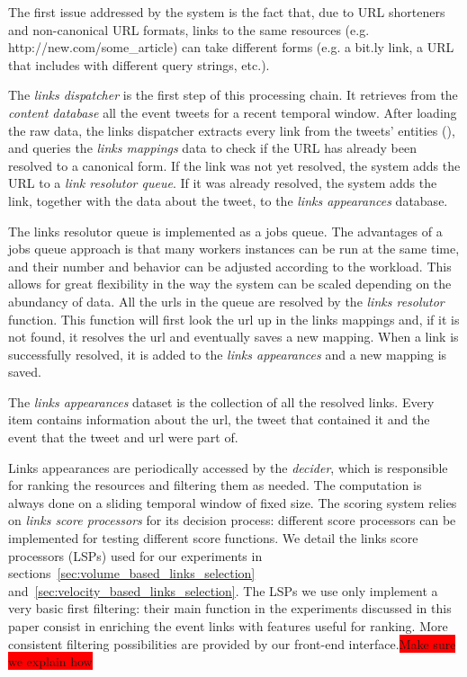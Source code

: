 \documentclass{sig-alternate}
\newcommand{\todo}[1]{\colorbox{red}{#1}}
\begin{document}
The first issue addressed by the system is the fact that, due to URL shorteners and non-canonical URL formats, links to the same resources (e.g. http://new.com/some\_article) can take different forms (e.g. a bit.ly link, a URL that includes with different query strings, etc.).  

The \emph{links dispatcher} is the first step of this processing chain. It retrieves from the \emph{content database} all the event tweets for a recent temporal window. After loading the raw data, the links dispatcher extracts every link from the tweets' entities (\cite{RestTweetsDoc}), and queries the \emph{links mappings} data to check if the URL has already been resolved to a canonical form. If the link was not yet resolved, the system adds the URL to a \emph{link resolutor queue}. If it was already resolved, the system adds the link, together with the data about the tweet, to the \emph{links appearances} database. 

The links resolutor queue is implemented as a jobs queue\cite{RedisQueues}. The advantages of a jobs queue approach is that many workers instances can be run at the same time, and their number and behavior can be adjusted according to the workload. This allows for great flexibility in the way the system can be scaled depending on the abundancy of data.
All the urls in the queue are resolved by the \emph{links resolutor} function. This function will first look the url up in the links mappings and, if it is not found, it resolves the url and eventually saves a new mapping. When a link is successfully resolved, it is added to the \emph{links appearances} and a new mapping is saved.

The \emph{links appearances} dataset is the collection of all the resolved links. Every item contains information about the url, the tweet that contained it and the event that the tweet and url were part of. %

Links appearances are periodically accessed by the \emph{decider}, which is responsible for ranking the resources and filtering them as needed. The computation is always done on a sliding temporal window of fixed size. The scoring system relies on \emph{links score processors} for its decision process: different score processors can be implemented for testing different score functions. We detail the links score processors (LSPs) used for our experiments in sections~\ref{sec:volume_based_links_selection} and~\ref{sec:velocity_based_links_selection}. The LSPs we use only implement a very basic first filtering: their main function in the experiments discussed in this paper consist in enriching the event links with features useful for ranking. More consistent filtering possibilities are provided by our front-end interface.\todo{Make sure we explain how}
\end{document}
